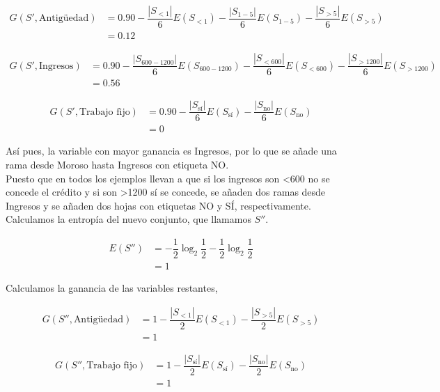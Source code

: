 \begin{ejemplo}
	\begin{align*}
	G(S', \text{Antigüedad}) & = 0.90 - \dfrac{|S_{<1}|}{6}E(S_{<1}) - \dfrac{|S_{1-5}|}{6}E(S_{1-5}) - \dfrac{|S_{>5}|}{6}E(S_{>5})\\
	                         & = 0.12
	\end{align*}
	
	\begin{align*}
	G(S', \text{Ingresos}) & = 0.90 - \dfrac{|S_{600-1200}|}{6}E(S_{600-1200}) - \dfrac{|S_{<600}|}{6}E(S_{<600}) - \dfrac{|S_{>1200}|}{6}E(S_{>1200})\\
	                       & = 0.56
	\end{align*}
	
	\begin{align*}
	G(S', \text{Trabajo fijo}) & = 0.90 - \dfrac{|S_{\text{sí}}|}{6}E(S_{\text{sí}}) - \dfrac{|S_{\text{no}}|}{6}E(S_{\text{no}})\\
	                           & = 0 
	\end{align*}
	
	Así pues, la variable con mayor ganancia es Ingresos, por lo que se añade una rama desde Moroso hasta Ingresos con etiqueta NO.\\
	
	Puesto que en todos los ejemplos llevan a que si los ingresos son <600 no se concede el crédito y si son >1200 sí se concede, se añaden dos ramas desde Ingresos y se añaden dos hojas con etiquetas NO y SÍ, respectivamente.\\
	
	Calculamos la entropía del nuevo conjunto, que llamamos $S''$.
	
	\begin{align*}
	E(S'') & = -\dfrac{1}{2}\log_2 \dfrac{1}{2} - \dfrac{1}{2}\log_2 \dfrac{1}{2}\\
	       & = 1
	\end{align*}
	
	Calculamos la ganancia de las variables restantes,
	
	\begin{align*}
	G(S'', \text{Antigüedad}) & = 1 - \dfrac{|S_{<1}|}{2}E(S_{<1}) - \dfrac{|S_{>5}|}{2}E(S_{>5})\\
	                          & = 1
	\end{align*}
	
	\begin{align*}
	G(S'', \text{Trabajo fijo}) & = 1 - \dfrac{|S_{\text{sí}}|}{2} E(S_{\text{sí}}) - \dfrac{|S_\text{no}|}{2} E(S_\text{no})\\
	                            & = 1
	\end{align*}
	

\end{ejemplo}
